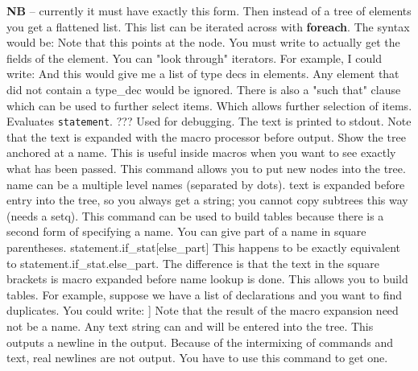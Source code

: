 \mps
{\bf NB} -- currently it must have exactly this form.
\mps
Then instead of a tree of elements you get a flattened list. This list can be 
iterated across with {\bf foreach}.  The syntax would be:
\smallskip
{}
\mps
Note that this points at the  node. You must write 
 to actually get the fields of the element.
\mps
You can "look through" iterators. For example, I could write:
\smallskip
{}
\mps
And this would give me a list of type decs in elements. Any element that did 
not contain a type\_dec would be ignored.
\mps
There is also a "such that" clause which can be used to further select items.
\smallskip
{}
\mps
Which allows further selection of items.
\medskip
{}
Evaluates {\tt statement}.
\medskip
{}
???
\medskip
{}
\mps
Used for debugging. The text is printed to stdout. Note that the text is 
expanded with the macro processor before output.
\smallskip
{}
\mps
Show the tree anchored at a name. This is useful inside macros when you 
want to see exactly what has been passed.
\smallskip
{}
\mps
This command allows you to put new nodes into the tree. name can be a multiple 
level names (separated by dots). text is expanded before entry into the tree, 
so you always get a string; you cannot copy subtrees this way (needs a setq).
This command can be used to build tables because there is a second form of 
specifying a name. You can give part of a name in square parentheses.
\smallskip
statement.if\_stat[else\_part]
\mps
This happens to be exactly equivalent to statement.if\_stat.else\_part. The 
difference is that the text in the square brackets is macro expanded before 
name lookup is done. This allows you to build tables.
\mps
\newpage
\noindent
For example, suppose we have a list of declarations and you want to find 
duplicates. You could write:
\smallskip
\beginCode
        \nt{set declarations[\nt{id.declaration.identifier}] to 
            \nt{declarations[\nt{id.declaration.type.identifier}}}]
\endCode
\mps
Note that the result of the macro expansion need not be a name. Any text string 
can and will be entered into the tree.
\mps
\nt{$/$}
\mps
This outputs a newline in the output. Because of the intermixing of commands 
and text, real newlines are not output. You have to use this command to get 
one.
\smallskip
{}

